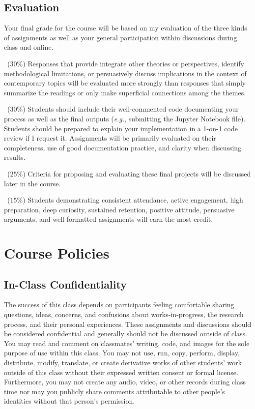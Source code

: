 \documentclass[10pt]{memoir}
\begin{document}
\subsection{Evaluation} 
Your final grade for the course will be based on my evaluation of the three kinds of assignments as well as your general participation within discussions during class and online. 

    \begin{description}[itemsep=0pt,labelsep=0pt]
        \item[Reading Responses]~($30\%$) Responses that provide integrate other theories or perspectives, identify methodological limitations, or persuasively discuss implications in the context of contemporary topics will be evaluated more strongly than responses that simply summarize the readings or only make superficial connections among the themes. 
        \item[Lab Assignments]~($30\%$) Students should include their well-commented code documenting your process as well as the final outputs (\textit{e.g.}, submitting the Jupyter Notebook file). Students should be prepared to explain your implementation in a 1-on-1 code review if I request it. Assignments will be primarily evaluated on their completeness, use of good documentation practice, and clarity when discussing results.
        \item[Final Project]~($25\%$) Criteria for proposing and evaluating these final projects will be discussed later in the course. 
        \item[Participation]~($15\%$) Students demonstrating consistent attendance, active engagement, high preparation, deep curiosity, sustained retention, positive attitude, persuasive arguments, and well-formatted assignments will earn the most credit.
    \end{description}

\section{Course Policies}

\subsection{In-Class Confidentiality}
The success of this class depends on participants feeling comfortable sharing questions, ideas, concerns, and confusions about works-in-progress, the research process, and their personal experiences. These assignments and discussions should be considered confidential and generally should not be discussed outside of class. You may read and comment on classmates' writing, code, and images for the sole purpose of use within this class. You may not use, run, copy, perform, display, distribute, modify, translate, or create derivative works of other students' work outside of this class without their expressed written consent or formal license. Furthermore, you may not create any audio, video, or other records during class time nor may you publicly share comments attributable to other people's identities without that person's permission.
\end{document}
